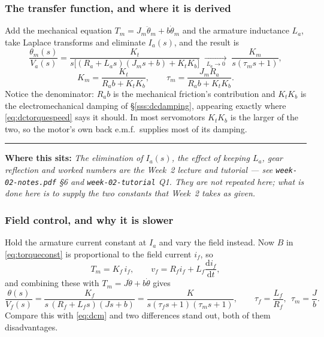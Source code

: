 \documentclass[11pt,a4paper]{article}
\newcommand{\statedin}[1]{%
  \par\smallskip\noindent
  \textcolor{fnavy}{\rule{\textwidth}{0.4pt}}\par\vspace{-4pt}
  {\small\textcolor{fnavy}{\textbf{Where this sits:}} \textit{#1}}\par\smallskip}
\begin{document}
\subsubsection{The transfer function, and where it is derived}

Add the mechanical equation $T_{m}=J_{m}\ddot\theta_{m}+b\dot\theta_{m}$ and
the armature inductance $L_{a}$, take Laplace transforms and eliminate
$I_{a}(s)$, and the result is
\begin{equation}
  \frac{\theta_{m}(s)}{V_{a}(s)}
     =\frac{K_{t}}{s\big[(R_{a}+L_{a}s)(J_{m}s+b)+K_{t}K_{b}\big]}
     \;\xrightarrow[\;L_{a}\to0\;]{}\;
     \frac{K_{m}}{s(\tau_{m}s+1)},
  \label{eq:dcm}
\end{equation}
\[
  K_{m}=\frac{K_{t}}{R_{a}b+K_{t}K_{b}},
  \qquad
  \tau_{m}=\frac{J_{m}R_{a}}{R_{a}b+K_{t}K_{b}} .
\]
Notice the denominator: $R_{a}b$ is the mechanical friction's contribution and
$K_{t}K_{b}$ is the electromechanical damping of \S\ref{sss:dcdamping},
appearing exactly where \eqref{eq:dctorquespeed} says it should. In most
servomotors $K_{t}K_{b}$ is the larger of the two, so the motor's own back
e.m.f.\ supplies most of its damping.

\statedin{The elimination of $I_{a}(s)$, the effect of keeping $L_{a}$, gear
reflection and worked numbers are the Week~2 lecture and tutorial --- see
\texttt{week-02-notes.pdf} \S6 and \texttt{week-02-tutorial} Q1. They are not
repeated here; what \emph{is} done here is to supply the two constants that
Week~2 takes as given.}

\subsubsection{Field control, and why it is slower}
\label{sss:field}

Hold the armature current constant at $I_{a}$ and vary the field instead. Now
$B$ in \eqref{eq:torqueconst} is proportional to the field current $i_{f}$, so
\[
  T_{m}=K_{f}\,i_{f},\qquad
  v_{f}=R_{f}i_{f}+L_{f}\frac{\mathrm{d}i_{f}}{\mathrm{d}t},
\]
and combining these with $T_{m}=J\ddot\theta+b\dot\theta$ gives
\begin{equation}
  \frac{\theta(s)}{V_{f}(s)}
   =\frac{K_{f}}{s\,(R_{f}+L_{f}s)(Js+b)}
   =\frac{K}{s(\tau_{f}s+1)(\tau_{m}s+1)},
  \qquad \tau_{f}=\frac{L_{f}}{R_{f}},\ \ \tau_{m}=\frac{J}{b}.
  \label{eq:fieldctl}
\end{equation}
Compare this with \eqref{eq:dcm} and two differences stand out, both of them
disadvantages.
\end{document}
